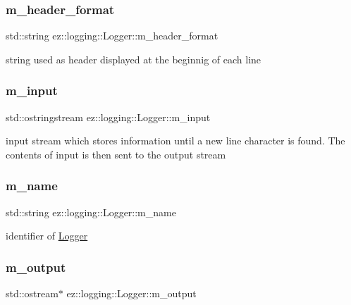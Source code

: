 \subsubsection{\texorpdfstring{m\+\_\+header\+\_\+format}{m\_header\_format}}
{\footnotesize\ttfamily std\+::string ez\+::logging\+::\+Logger\+::m\+\_\+header\+\_\+format\hspace{0.3cm}{\ttfamily [protected]}}

string used as header displayed at the beginnig of each line \mbox{\label{classez_1_1logging_1_1Logger_aa6583295cf06de1b03304c454cea4c54}} 
\subsubsection{\texorpdfstring{m\+\_\+input}{m\_input}}
{\footnotesize\ttfamily std\+::ostringstream ez\+::logging\+::\+Logger\+::m\+\_\+input\hspace{0.3cm}{\ttfamily [protected]}}

input stream which stores information until a new line character is found. The contents of input is then sent to the output stream \mbox{\label{classez_1_1logging_1_1Logger_abf66c0dd07742763114cb5a25b3fe7cf}} 
\subsubsection{\texorpdfstring{m\+\_\+name}{m\_name}}
{\footnotesize\ttfamily std\+::string ez\+::logging\+::\+Logger\+::m\+\_\+name\hspace{0.3cm}{\ttfamily [protected]}}

identifier of \hyperlink{classez_1_1logging_1_1Logger}{Logger} \mbox{\label{classez_1_1logging_1_1Logger_a5859fadb7d5a62e6f39a6a6dfc36d39b}} 
\subsubsection{\texorpdfstring{m\+\_\+output}{m\_output}}
{\footnotesize\ttfamily std\+::ostream$\ast$ ez\+::logging\+::\+Logger\+::m\+\_\+output\hspace{0.3cm}{\ttfamily [protected]}}

